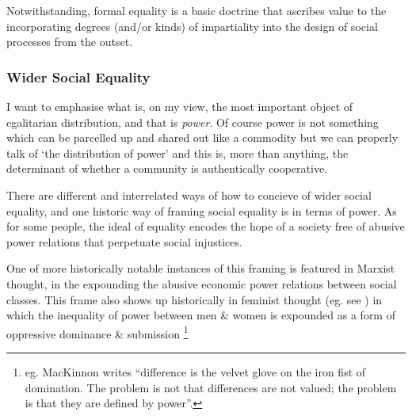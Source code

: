 Notwithstanding, formal equality is a basic doctrine that ascribes value to the incorporating degrees (and/or kinds) of impartiality into the design of social processes from the outset.%

\subsubsection{Wider Social Equality}

\begin{displayquote}
I want to emphasise what is, on my view, the most important object of egalitarian distribution, and that is \textit{power}. Of course power is not something which can be parcelled up and shared out like a commodity but we can properly talk of `the distribution of power' and this is, more than anything, the determinant of whether a community is authentically cooperative.\cite{TheSocialBasisofEquality:1998}
\end{displayquote}

There are different and interrelated ways of how to concieve of wider social equality, and one historic way of framing social equality is in terms of power.
As for some people, the ideal of equality encodes the hope of a society free of abusive power relations that perpetuate social injustices.

One of more historically notable instances of this framing is featured in Marxist thought, in the expounding the abusive economic power relations between social classes. This frame also shows up historically in feminist thought (eg. see \cite{Cudd2006-CUDAO}) in which the inequality of power between men \& women is expounded as a form of oppressive dominance \& submission \footnote{eg. MacKinnon writes ``difference is the velvet glove on the iron fist of domination. The problem is not that differences are not valued; the problem is that they are defined by power''\cite{mackinnon1989toward}.}

